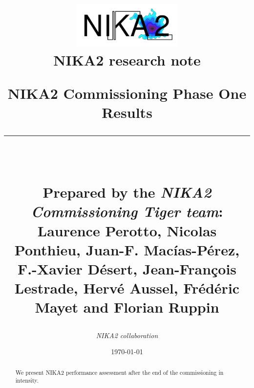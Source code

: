 \documentclass[a4paper, 11pt]{report}
\makeatletter
\renewcommand{\maketitle}{ %
\begin{flushleft} %
{\LARGE\@title} %

\vspace{50pt} %

{\large\@author} %
\\\@date %

\vspace{40pt} %
\end{flushleft}
}
\makeatother
\begin{document}
\title{\parbox{16cm}{
    \includegraphics[width=5.5cm]{Figures/Logo_NIKA2.pdf} \\ [5mm]   
    \textbf{NIKA2 research note} \\ [5cm]   
    \begin{center}\sf\bfseries\huge
      NIKA2 Commissioning Phase One Results \\ [-4mm]
      \rule{16cm}{1pt}\\ [2cm]   
    \end{center}
    \begin{center} \small
      Prepared by the \emph{NIKA2 Commissioning Tiger team}: \\
      Laurence Perotto,  Nicolas Ponthieu, Juan-F. Mac\'ias-P\'erez,
      F.-Xavier D\'esert, Jean-Fran\c cois Lestrade, Herv\'e Aussel,
      Fr\'ed\'eric Mayet and Florian Ruppin\\ [4cm]     
    \end{center}
  }
}
\author{{\textit{NIKA2 collaboration}}  }
\date{\today}

\maketitle %
%
%
%


\tableofcontents

\clearpage
\listoffigures
\listoftables


\newpage
{}

\begin{abstract}
We present NIKA2 performance assessment after the end of the commissioning in intensity.
\end{abstract}
\end{document}
